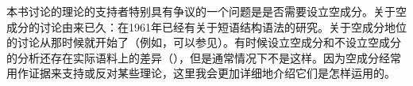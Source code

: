 本书讨论的理论的支持者特别具有争议的一个问题是是否需要设立空成分。关于空成分的讨论由来已久：在1961年已经有关于短语结构语法的研究\citep*{BHPS61a}。关于空成分地位的讨论从那时候就开始了（例如，可以参见\citealp*{Loebner86a,Wunderlich87d,Wunderlich89,Stechow89,Haider97a,Sag2000a,BMS2001a,LH2006a,Mueller2004e,AS2015a}）。有时候设立空成分和不设立空成分的分析还存在实际语料上的差异（\citep{AS2015a}），但是通常情况下不是这样。因为空成分经常用作证据来支持或反对某些理论，这里我会更加详细地介绍它们是怎样运用的。

